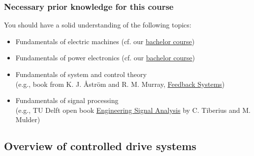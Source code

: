\begin{frame}
    \frametitle{Necessary prior knowledge for this course}
    You should have a solid understanding of the following topics:
    \begin{itemize}
        \item Fundamentals of electric machines (cf. our  \href{https://github.com/IAS-Uni-Siegen/EMD_course/}{bachelor course})
        \item<2-> Fundamentals of power electronics (cf. our  \href{https://github.com/IAS-Uni-Siegen/PE_course/}{bachelor course})
        \item<3-> Fundamentals of system and control theory \\(e.g., book from K. J. Åström and R. M. Murray, \href{https://fbswiki.org/wiki/index.php/Feedback_Systems:_An_Introduction_for_Scientists_and_Engineers}{Feedback Systems})
        \item<4-> Fundamentals of signal processing \\(e.g., TU Delft open book \href{https://books.open.tudelft.nl/home/catalog/book/247}{Engineering Signal Analysis} by C. Tiberius and M. Mulder)
    \end{itemize}
    \vspace{0.5cm}
\end{frame}


\subsection{Overview of controlled drive systems}

